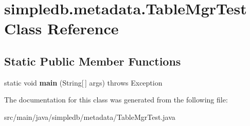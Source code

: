 \hypertarget{classsimpledb_1_1metadata_1_1TableMgrTest}{}\section{simpledb.\+metadata.\+Table\+Mgr\+Test Class Reference}
\label{classsimpledb_1_1metadata_1_1TableMgrTest}
\subsection*{Static Public Member Functions}
\begin{DoxyCompactItemize}
\item 
\mbox{\label{classsimpledb_1_1metadata_1_1TableMgrTest_a5172948508de0e37bab85da3385f22af}} 
static void {\bfseries main} (String\mbox{[}$\,$\mbox{]} args)  throws Exception 
\end{DoxyCompactItemize}


The documentation for this class was generated from the following file\+:\begin{DoxyCompactItemize}
\item 
src/main/java/simpledb/metadata/Table\+Mgr\+Test.\+java\end{DoxyCompactItemize}
